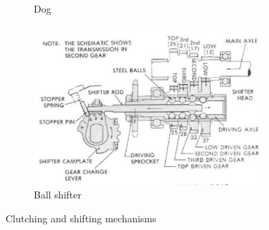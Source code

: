 \documentclass[10pt,letterpaper]{book}
\begin{document}
\begin{figure}[H]
\begin{subfigure}[b]{.32\linewidth}
		\caption{Dog}
	\end{subfigure}
	
	\begin{subfigure}[b]{.60\linewidth}
		\includegraphics[width=0.95\textwidth]{imgs/ball_shifter.png}
		\caption{Ball shifter}
	\end{subfigure}
	\caption{Clutching and shifting mechanisms}
\end{figure}
\end{document}
